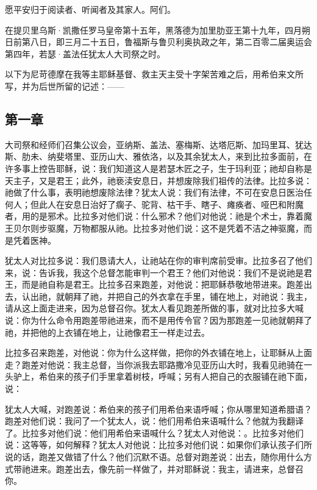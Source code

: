 愿平安归于阅读者、听闻者及其家人。阿们。\par

在提贝里乌斯·凯撒任罗马皇帝第十五年，黑落德为加里肋亚王第十九年，四月朔日前第八日，即三月二十五日，鲁福斯与鲁贝利奥执政之年，第二百零二届奥运会第四年，若瑟·盖法任犹太人大司祭之时。\par

以下为尼苛德摩在我等主耶稣基督、救主天主受十字架苦难之后，用希伯来文所写，并为后世所留的记述：——\par


\subsection{第一章}

大司祭和经师们召集公议会，亚纳斯、盖法、塞梅斯、达塔厄斯、加玛里耳、犹达斯、肋未、纳斐塔里、亚历山大、雅依洛，以及其余犹太人，来到比拉多面前，在许多事上控告耶稣，说：我们知道这人是若瑟木匠之子，生于玛利亚；祂却自称是天主子，又是君王；此外，祂亵渎安息日，并想废除我们祖传的法律。比拉多说：祂做了什么事，表明祂想废除法律？犹太人说：我们有法律，不可在安息日医治任何人；但此人在安息日治好了瘸子、驼背、枯干手、瞎子、瘫痪者、哑巴和附魔者，用的是邪术。比拉多对他们说：什么邪术？他们对他说：祂是个术士，靠着魔王贝尔则步驱魔，万物都服从祂。比拉多对他们说：这不是凭着不洁之神驱魔，而是凭着医神。\par

犹太人对比拉多说：我们恳请大人，让祂站在你的审判席前受审。比拉多召了他们来，说：告诉我，我这个总督怎能审判一个君王？他们对他说：我们不是说祂是君王，而是祂自称是君王。比拉多召来跑差，对他说：把耶稣恭敬地带进来。跑差出去，认出祂，就朝拜了祂，并把自己的外衣拿在手里，铺在地上，对祂说：我主，请从这上面走进来，因为总督召你。犹太人看见跑差所做的事，就对比拉多大喊说：你为什么命令用跑差带祂进来，而不是用传令官？因为那跑差一见祂就朝拜了祂，并把他的上衣铺在地上，让祂像君王一样走过去。\par

比拉多召来跑差，对他说：你为什么这样做，把你的外衣铺在地上，让耶稣从上面走？跑差对他说：我主总督，当你派我去耶路撒冷见亚历山大时，我看见祂骑在一头驴上，希伯来的孩子们手里拿着树枝，呼喊；另有人把自己的衣服铺在祂下面，说：\par

犹太人大喊，对跑差说：希伯来的孩子们用希伯来语呼喊；你从哪里知道希腊语？跑差对他们说：我问了一个犹太人，说：他们用希伯来语喊什么？他就为我翻译了。比拉多对他们说：他们用希伯来语喊什么？犹太人对他说：。比拉多对他们说：这等等，如何解释？犹太人对他说：比拉多对他们说：如果你们承认孩子们所说的话，跑差又做错了什么？他们沉默不语。总督对跑差说：出去，随你用什么方式带祂进来。跑差出去，像先前一样做了，并对耶稣说：我主，请进来，总督召你。\par

